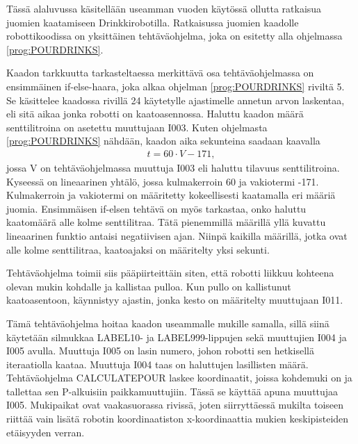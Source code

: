 Tässä alaluvussa käsitellään useamman vuoden käytössä ollutta ratkaisua juomien kaatamiseen Drinkkirobotilla. Ratkaisussa juomien kaadolle robottikoodissa on yksittäinen tehtäväohjelma, joka on esitetty alla ohjelmassa \ref{prog:POURDRINKS}.

\lstset{style=Yaskawatyyli}


Kaadon tarkkuutta tarkasteltaessa merkittävä osa tehtäväohjelmassa on ensimmäinen if-else-haara, joka alkaa ohjelman \ref{prog:POURDRINKS} riviltä 5. Se käsittelee kaadossa rivillä 24 käytetylle ajastimelle annetun arvon laskentaa, eli sitä aikaa jonka robotti on kaatoasennossa. Haluttu kaadon määrä senttilitroina on asetettu muuttujaan I003. Kuten ohjelmasta \ref{prog:POURDRINKS} nähdään, kaadon aika sekunteina saadaan kaavalla
\begin{align}
   t = 60 \cdot V - 171 \mathrm{,}
\end{align}
jossa V on tehtäväohjelmassa muuttuja I003 eli haluttu tilavuus senttilitroina. Kyseessä on lineaarinen yhtälö, jossa kulmakerroin 60 ja vakiotermi -171. Kulmakerroin ja vakiotermi on määritetty kokeellisesti kaatamalla eri määriä juomia. Ensimmäisen if-elsen tehtävä on myös tarkastaa, onko haluttu kaatomäärä alle kolme senttilitraa. Tätä pienemmillä määrillä yllä kuvattu lineaarinen funktio antaisi negatiivisen ajan. Niinpä kaikilla määrillä, jotka ovat alle kolme senttilitraa, kaatoajaksi on määritelty yksi sekunti.

Tehtäväohjelma toimii siis pääpiirteittäin siten, että robotti liikkuu kohteena olevan mukin kohdalle ja kallistaa pulloa. Kun pullo on kallistunut kaatoasentoon, käynnistyy ajastin, jonka kesto on määritelty muuttujaan I011.

Tämä tehtäväohjelma hoitaa kaadon useammalle mukille samalla, sillä siinä käytetään silmukkaa LABEL10- ja LABEL999-lippujen sekä muuttujien I004 ja I005 avulla. Muuttuja I005 on lasin numero, johon robotti sen hetkisellä iteraatiolla kaataa. Muuttuja I004 taas on haluttujen lasillisten määrä. Tehtäväohjelma CALCULATEPOUR laskee koordinaatit, joissa kohdemuki on ja tallettaa sen P-alkuisiin paikkamuuttujiin. Tässä se käyttää apuna muuttujaa I005. Mukipaikat ovat vaakasuorassa rivissä, joten siirryttäessä mukilta toiseen riittää vain lisätä robotin koordinaatiston x-koordinaattia mukien keskipisteiden etäisyyden verran.

